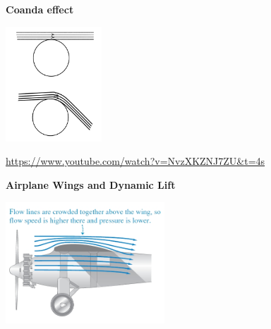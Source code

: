 \documentclass[]{beamer}
\begin{document}







\begin{frame}



  \textbf{Coanda effect}
  
    \begin{center}
    \includegraphics[height=1.7in]{images2/coanda.jpg}
  \end{center}
  
  
  \url{https://www.youtube.com/watch?v=NvzXKZNJ7ZU&t=4s}
  
   \end{frame}
  
  
  \begin{frame}
  
  
  
    \textbf{ Airplane Wings and Dynamic Lift}
  \vspace{3mm}
  
  
    \begin{center}
    \includegraphics[height=1.8in]{images2/plane0.jpg}
  \end{center}
  
  
   \end{frame}
\end{document}
